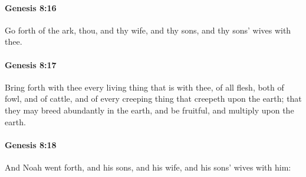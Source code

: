 		\paragraph{Genesis 8:16} %
			\label{GENESIS-8-16}

			Go forth of the ark, thou, and thy wife, and thy sons, and thy sons' wives with thee.


		\paragraph{Genesis 8:17} %
			\label{GENESIS-8-17}

			Bring forth with thee every living thing that is with thee, of all flesh, both of fowl, and of cattle, and of every creeping thing that creepeth upon the earth; that they may breed abundantly in the earth, and be fruitful, and multiply upon the earth.


		\paragraph{Genesis 8:18} %
			\label{GENESIS-8-18}

			And Noah went forth, and his sons, and his wife, and his sons' wives with him:


